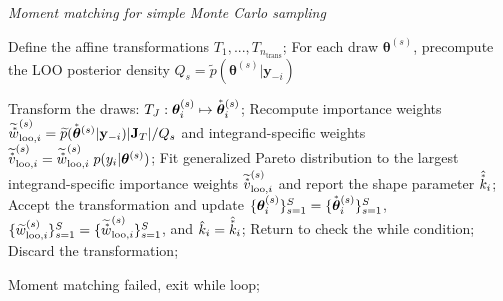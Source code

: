 \documentclass[12pt]{article}
\newcommand{\ome}{v}
\newcommand{\transf}{\accentset{\ast}}
\begin{document}
\begin{algorithm*}[htb]
	\caption{\em Moment matching for simple Monte Carlo sampling}\label{alg:mm-smc}
	\begin{algorithmic}[1]
	\STATE Define the affine transformations $T_1 , ... , T_{n_{\text{trans}}}$;
	    \STATE For each draw $\boldsymbol{\theta}^{(s)}$, precompute the LOO posterior density $Q_s = \widetilde{p} (\boldsymbol{\theta}^{(s)}|\mathbf{y}_{-i})$
	    
		
		\STATE Transform the draws: $T_J: \boldsymbol{\theta}_i^{(s)} \mapsto \transf{\boldsymbol{\theta}}_i^{(s)}$;
		\STATE Recompute importance weights $\widetilde{\transf{w}}_{\text{loo},i}^{(s)} = \widetilde{p} (\transf{\boldsymbol{\theta}}^{(s)}|\mathbf{y}_{-i}) |\mathbf{J}_T| /Q_s$ and integrand-specific weights
		$\widetilde{\transf{\ome}}_{\text{loo},i}^{(s)} = \widetilde{\transf{w}}_{\text{loo},i}^{(s)} \; p(y_i | \boldsymbol{\theta}^{(s)})$;
		\STATE Fit generalized Pareto distribution to the largest integrand-specific importance weights $\widetilde{\transf{\ome}}_{\text{loo},i}^{(s)}$ and report the shape parameter $\hat{\transf{k}}_i$;
		\IF{$\hat{\transf{k}}_i < \hat{k}_i$}
		\STATE Accept the transformation and update $\{ \boldsymbol{\theta}_i^{(s)} \}_{s = 1}^S = \{ \transf{\boldsymbol{\theta}}_i^{(s)} \}_{s = 1}^S$, $\{ \widetilde{w}_{\text{loo},i}^{(s)} \}_{s = 1}^S = \{ \widetilde{\transf{w}}_{\text{loo},i}^{(s)} \}_{s = 1}^S$, and $\hat{k}_i = \hat{\transf{k}}_i$;
		\STATE Return to check the while condition;
		\ELSE
		\STATE Discard the transformation;
		\ENDIF
		
		
		\ENDFOR
		
		\STATE Moment matching failed, exit while loop;
		\ENDIF
		
		\ENDWHILE
		 
	\end{algorithmic}
\end{algorithm*}
\end{document}
